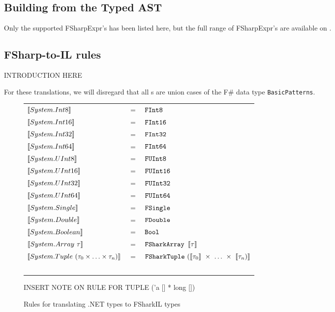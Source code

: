 \subsection*{Building \fshark{} from the Typed AST}
\label{sec:fsharkcompilerrules}
Only the supported FSharpExpr's has been listed here, but the full range of
FSharpExpr's are available on \cite{typedtree}.

\subsection*{FSharp-to-\fshark{}IL rules}
INTRODUCTION HERE

For these translations, we will disregard that all \fsharpexpr{}s are union
cases of the F\# data type \texttt{BasicPatterns}.


\begin{figure}
  \centering
\begin{tabular}{@{}l c l}%
  $\llbracket System.Int8 \rrbracket$ & $=$ & $\text{\ttfamily FInt8} $ \\ 
  $\llbracket System.Int16 \rrbracket$ & $=$ & $\text{\ttfamily FInt16}$
  \\
  $\llbracket System.Int32 \rrbracket$ & $=$ & $\text{\ttfamily FInt32} $ \\ 
  $\llbracket System.Int64 \rrbracket$ & $=$ & $\text{\ttfamily FInt64} $
  \\
  $\llbracket System.UInt8 \rrbracket$ & $=$ & $\text{\ttfamily FUInt8} $ \\ 
  $\llbracket System.UInt16 \rrbracket$ & $=$ & $\text{\ttfamily FUInt16} $ 
  \\
  $\llbracket System.UInt32 \rrbracket$ & $=$ & $\text{\ttfamily FUInt32} $ \\ 
  $\llbracket System.UInt64 \rrbracket$ & $=$ & $\text{\ttfamily FUInt64} $ 
  \\
  $\llbracket System.Single \rrbracket$ & $=$ & $\text{\ttfamily FSingle} $ \\ 
  $\llbracket System.Double \rrbracket$ & $=$ & $\text{\ttfamily FDouble} $ 
  \\
  $\llbracket System.Boolean \rrbracket$ & $=$ & $\text{\ttfamily Bool} $ \\ 
  $\llbracket System.Array~\tau \rrbracket$ & $=$ & $\text{\ttfamily {\texttt{FShark}}{}Array }\llbracket \tau \rrbracket$
  \\
  $\llbracket System.Tuple~(\tau_0 \times \ldots \times \tau_n) \rrbracket$ & $=$ & $\text{\ttfamily {\texttt{FShark}}{}Tuple}~(\llbracket \tau_0 \rrbracket~\times~\ldots~\times~\llbracket \tau_n) \rrbracket$ \\ ~ \\
\end{tabular}

INSERT NOTE ON RULE FOR TUPLE ('a [] * long [])

\caption{Rules for translating .NET types to FSharkIL types}
\end{figure}

